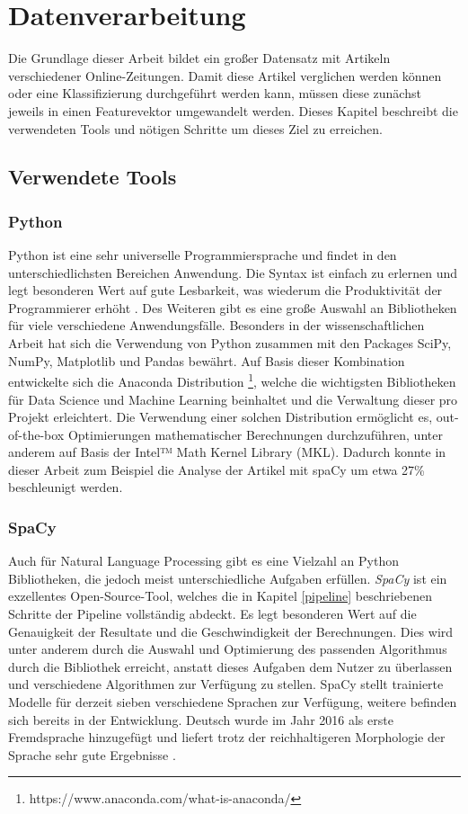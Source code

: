 \chapter{Datenverarbeitung}
Die Grundlage dieser Arbeit bildet ein großer Datensatz mit Artikeln verschiedener Online-Zeitungen. Damit diese Artikel verglichen werden können oder eine Klassifizierung durchgeführt werden kann, müssen diese zunächst jeweils in einen Featurevektor umgewandelt werden. Dieses Kapitel beschreibt die verwendeten Tools und nötigen Schritte um dieses Ziel zu erreichen.

\section{Verwendete Tools}

\subsection{Python}\label{python}
Python ist eine sehr universelle Programmiersprache und findet in den unterschiedlichsten Bereichen Anwendung. Die Syntax ist einfach zu erlernen und legt besonderen Wert auf gute Lesbarkeit, was wiederum die Produktivität der Programmierer erhöht \cite{pythonSummary}. Des Weiteren gibt es eine große Auswahl an Bibliotheken für viele verschiedene Anwendungsfälle. Besonders in der wissenschaftlichen Arbeit hat sich die Verwendung von Python zusammen mit den Packages SciPy, NumPy, Matplotlib und Pandas bewährt. Auf Basis dieser Kombination entwickelte sich die Anaconda Distribution \footnote{https://www.anaconda.com/what-is-anaconda/}, welche die wichtigsten Bibliotheken für Data Science und Machine Learning beinhaltet und die Verwaltung dieser pro Projekt erleichtert. Die Verwendung einer solchen Distribution ermöglicht es, out-of-the-box Optimierungen mathematischer Berechnungen durchzuführen, unter anderem auf Basis der Intel™ Math Kernel Library (MKL). Dadurch konnte in dieser Arbeit zum Beispiel die Analyse der Artikel mit spaCy um etwa 27\% beschleunigt werden.

\subsection{SpaCy}
Auch für Natural Language Processing gibt es eine Vielzahl an Python Bibliotheken, die jedoch meist unterschiedliche Aufgaben erfüllen. \emph{SpaCy} ist ein exzellentes Open-Source-Tool, welches die in Kapitel \ref{pipeline} beschriebenen Schritte der Pipeline vollständig abdeckt. Es legt besonderen Wert auf die Genauigkeit der Resultate und die Geschwindigkeit der Berechnungen. Dies wird unter anderem durch die Auswahl und Optimierung des passenden Algorithmus durch die Bibliothek erreicht, anstatt dieses Aufgaben dem Nutzer zu überlassen und verschiedene Algorithmen zur Verfügung zu stellen. SpaCy stellt trainierte Modelle für derzeit sieben verschiedene Sprachen zur Verfügung, weitere befinden sich bereits in der Entwicklung. Deutsch wurde im Jahr 2016 als erste Fremdsprache hinzugefügt und liefert trotz der reichhaltigeren Morphologie der Sprache sehr gute Ergebnisse \cite{spacyGerman}.

